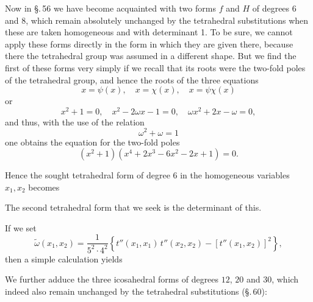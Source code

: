 Now in \S.\,56 we have become acquainted with two forms $f$ and $H$ of degrees $6$ and $8$, which remain absolutely unchanged by the tetrahedral substitutions when these are taken homogeneous and with determinant 1. To be sure, we cannot apply these forms directly in the form in which they are given there, because there the tetrahedral group was assumed in a different shape. But we find the first of these forms very simply if we recall that its roots were the two-fold poles of the tetrahedral group, and hence the roots of the three equations
\[
x = \psi(x), \quad x = \chi(x), \quad x = \psi\chi(x)
\]
or
\[
x^2 + 1 = 0, \quad x^2 - 2\omega x - 1 = 0, \quad \omega x^2 + 2x - \omega = 0,
\]
and thus, with the use of the relation
\[
\omega^2 + \omega = 1
\]
one obtains the equation for the two-fold poles
\[
(x^2+1)(x^4+2x^3-6x^2-2x+1) = 0.
\]

Hence the sought tetrahedral form of degree $6$ in the homogeneous variables $x_1, x_2$ becomes

The second tetrahedral form that we seek is the  determinant of this.

If we set
\[
\tilde\omega(x_1,x_2) = \dfrac{1}{5^2 \cdot 4^2} \left\{ t''(x_1,x_1)\, t''(x_2,x_2) - [t''(x_1,x_2)]^2 \right\},
\]
then a simple calculation yields

We further adduce the three icosahedral forms of degrees $12$, $20$ and $30$, which indeed also remain unchanged by the tetrahedral substitutions (\S.\,60):
